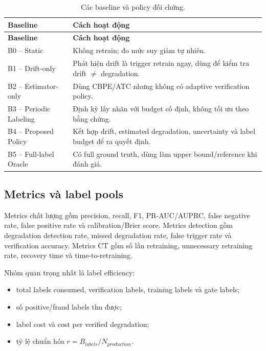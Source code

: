 \begin{longtable}{@{}L{3.5cm} L{\dimexpr\linewidth-3.5cm-2\tabcolsep\relax}@{}}
\caption{Các baseline và policy đối chứng.}\label{tab:baselines}\\
\toprule\textbf{Baseline} & \textbf{Cách hoạt động}\\
\midrule\endfirsthead
\toprule\textbf{Baseline} & \textbf{Cách hoạt động}\\
\midrule\endhead
B0 -- Static & Không retrain; đo mức suy giảm tự nhiên.\\
B1 -- Drift-only & Phát hiện drift là trigger retrain ngay, dùng để kiểm tra drift \(\ne\) degradation.\\
B2 -- Estimator-only & Dùng CBPE/ATC nhưng không có adaptive verification policy.\\
B3 -- Periodic Labeling & Định kỳ lấy nhãn với budget cố định, không tối ưu theo bằng chứng.\\
B4 -- Proposed Policy & Kết hợp drift, estimated degradation, uncertainty và label budget để ra quyết định.\\
B5 -- Full-label Oracle & Có full ground truth, dùng làm upper bound/reference khi đánh giá.\\
\bottomrule
\end{longtable}

\subsection{Metrics và label pools}

Metrics chất lượng gồm precision, recall, F1, PR-AUC/AUPRC, false negative rate, false positive rate và calibration/Brier score. Metrics detection gồm degradation detection rate, missed degradation rate, false trigger rate và verification accuracy. Metrics CT gồm số lần retraining, unnecessary retraining rate, recovery time và time-to-retraining.

Nhóm quan trọng nhất là label efficiency:

\begin{itemize}
  \item total labels consumed, verification labels, training labels và gate labels;
  \item số positive/fraud labels thu được;
  \item label cost và cost per verified degradation;
  \item tỷ lệ chuẩn hóa \(r=B_{labels}/N_{production}\).
\end{itemize}

